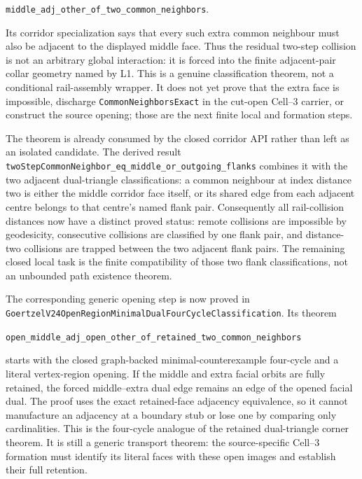 \documentclass[11pt]{article}
\theoremstyle{definition}
\begin{document}
\begin{center}
\texttt{middle\_adj\_other\_of\_two\_common\_neighbors}.
\end{center}

Its corridor specialization says that every such extra common neighbour must
also be adjacent to the displayed middle face.  Thus the residual two-step
collision is not an arbitrary global interaction: it is forced into the
finite adjacent-pair collar geometry named by L1.  This is a genuine
classification theorem, not a conditional rail-assembly wrapper.  It does
not yet prove that the extra face is impossible, discharge
\texttt{CommonNeighborsExact} in the cut-open Cell--3 carrier, or construct
the source opening; those are the next finite local and formation steps.

The theorem is already consumed by the closed corridor API rather than left
as an isolated candidate.  The derived result
\texttt{twoStepCommonNeighbor\_eq\_middle\_or\_outgoing\_flanks} combines it
with the two adjacent dual-triangle classifications: a common neighbour at
index distance two is either the middle corridor face itself, or its shared
edge from each adjacent centre belongs to that centre's named flank pair.
Consequently all rail-collision distances now have a distinct proved status:
remote collisions are impossible by geodesicity, consecutive collisions are
classified by one flank pair, and distance-two collisions are trapped between
the two adjacent flank pairs.  The remaining closed local task is the finite
compatibility of those two flank classifications, not an unbounded path
existence theorem.

The corresponding generic opening step is now proved in
\texttt{GoertzelV24OpenRegionMinimalDualFourCycleClassification}.  Its theorem

\begin{center}
\texttt{open\_middle\_adj\_open\_other\_of\_retained\_two\_common\_neighbors}
\end{center}

starts with the closed graph-backed minimal-counterexample four-cycle and a
literal vertex-region opening.  If the middle and extra facial orbits are
fully retained, the forced middle--extra dual edge remains an edge of the
opened facial dual.  The proof uses the exact retained-face adjacency
equivalence, so it cannot manufacture an adjacency at a boundary stub or lose
one by comparing only cardinalities.  This is the four-cycle analogue of the
retained dual-triangle corner theorem.  It is still a generic transport
theorem: the source-specific Cell--3 formation must identify its literal faces
with these open images and establish their full retention.
\end{document}
